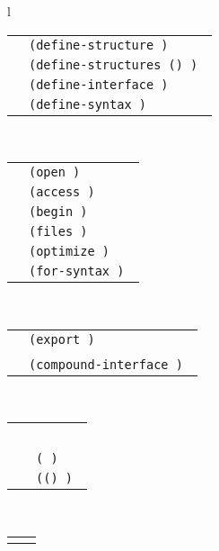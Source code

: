 \begin{figure}[htb]

  \begin{tabular}{l}
    \goesto{}~ \\

   \begin{tabular}{rl}
   \syn{definition} \goesto{} &
      \tt(define-structure \syn{name} \syn{interface}
          \arbno{\syn{clause}}) \\
        \altz{} & \tt(define-structures (\arbno{(\syn{name} \syn{interface})})
          \arbno{\syn{clause}}) \\
        \altz{} & \tt(define-interface \syn{name} \syn{interface}) \\
        \altz{} & \tt(define-syntax \syn{name} \syn{transformer-spec})
   \end{tabular}
   \\
   \begin{tabular}{rl}
   \syn{clause} \goesto{} & \tt(open \arbno{\syn{structure}}) \\
        \altz{} & \tt(access \arbno{\syn{name}}) \\
        \altz{} & \tt(begin \syn{program}) \\
        \altz{} & \tt(files \arbno{\syn{filespec}}) \\
        \altz{} & \tt(optimize \arbno{\syn{optimize-spec}}) \\
        \altz{} & \tt(for-syntax \arbno{\syn{clause}})
   \end{tabular}
   \\
   \begin{tabular}{rl}
   \syn{interface} \goesto{} &  \tt(export \arbno{\syn{item}}) \\
        \altz{} & \syn{name} \\
        \altz{} & \tt(compound-interface \arbno{\syn{interface}})
   \end{tabular}
   \\
   \begin{tabular}{rl}
   \syn{item} \goesto{}~ \syn{name} \\
        \altz{} & \tt(\syn{name} \syn{type}) \\
        \altz{} & \tt((\arbno{\syn{name}}) \syn{type})
   \end{tabular}
   \\
   \begin{tabular}{rl}
   \syn{structure} \goesto{} & \syn{name} \\

\end{tabular}
\end{tabular}
\end{figure}
